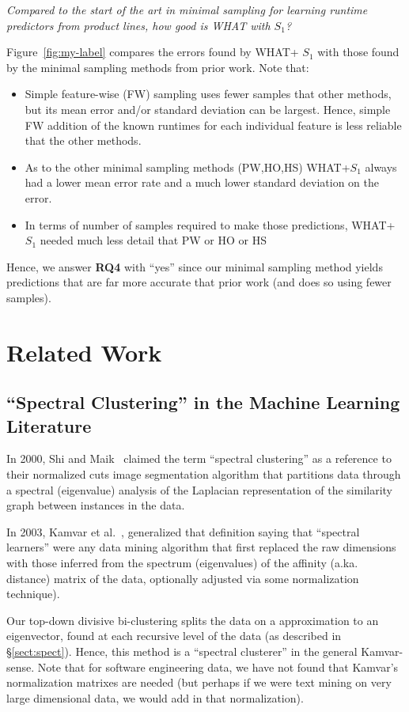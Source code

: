 \documentclass{sig-alternative}
\newcommand{\bi}{\begin{itemize}}%
\newcommand{\ei}{\end{itemize}}
\newcommand{\tion}[1]{\S\ref{sect:#1}}
\newcommand{\fig}[1]{Figure~\ref{fig:#1}}
\begin{document}
{\em Compared to the start of the art in minimal sampling for
learning runtime predictors from product lines, how good is WHAT with $S_1$?}



\fig{my-label} compares the errors found by  WHAT+ $S_1$ with those found by the minimal sampling
methods from prior work. Note that:
\bi
\item
Simple feature-wise (FW) sampling uses fewer samples that 
other methods, but its mean error and/or standard deviation can be largest. Hence, simple FW addition
of the known runtimes for each individual feature is less reliable that the other methods.
\item
As to the other minimal sampling methods  (PW,HO,HS)  WHAT+$S_1$ always had a   lower mean
error rate and a much lower standard deviation on the error.  
\item In terms of number of samples required to make those predictions, WHAT+$S_1$ needed
much less detail that PW or HO or HS
\ei

Hence, we answer {\bf RQ4} with ``yes''
since our minimal sampling method yields predictions that are far more accurate that prior
work (and does so using fewer samples).



 \section{Related Work}
 \subsection{``Spectral Clustering'' in the  Machine Learning Literature}\label{sect:related}
 
In 2000, Shi and Maik~\cite{shi00} claimed the term ``spectral clustering'' as a reference to their normalized cuts
image
segmentation algorithm that  partitions data through a spectral (eigenvalue) analysis of the  
Laplacian representation of the similarity graph between instances in the data.

In 2003, Kamvar et al.~\cite{kamvar2003spectral},  generalized that definition saying that ``spectral learners''
were any data mining algorithm that first replaced the raw
dimensions with those inferred from the spectrum (eigenvalues) of the affinity (a.ka. distance)
matrix of the data, optionally adjusted via some normalization technique).

Our
top-down divisive bi-clustering splits the data on a   approximation to an eigenvector, found at each recursive level
of the data (as described in \tion{spect}). 
Hence, this  method is a ``spectral clusterer'' in the general Kamvar-sense. 
Note that
for software engineering data, we have
not found that Kamvar's normalization matrixes are needed (but perhaps if we were text mining
on very large dimensional data, we would add in that normalization). 
 
\end{document}
